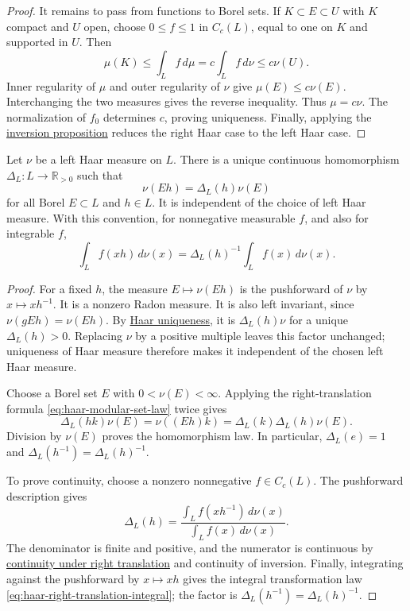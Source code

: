 \begin{proof}
It remains to pass from functions to Borel sets. If $K\subset E\subset U$ with $K$ compact and $U$ open, choose $0\leq f\leq1$ in $C_c(L)$, equal to one on $K$ and supported in $U$. Then
\[
 \mu(K)\leq\int_L f\,d\mu
 =c\int_L f\,d\nu\leq c\nu(U).
\]
Inner regularity of $\mu$ and outer regularity of $\nu$ give $\mu(E)\leq c\nu(E)$. Interchanging the two measures gives the reverse inequality. Thus $\mu=c\nu$. The normalization of $f_0$ determines $c$, proving uniqueness. Finally, applying the \hyperref[measure.haar-inversion]{inversion proposition} reduces the right Haar case to the left Haar case.
\end{proof}

\begin{proposition}\label{measure.haar-modular-function}
Let $\nu$ be a left Haar measure on $L$. There is a unique continuous homomorphism $\Delta_L:L\to\mathbb R_{>0}$ such that
\begin{equation}\label{eq:haar-modular-set-law}
 \nu(Eh)=\Delta_L(h)\nu(E)
\end{equation}
for all Borel $E\subset L$ and $h\in L$. It is independent of the choice of left Haar measure. With this convention, for nonnegative measurable $f$, and also for integrable $f$,
\begin{equation}\label{eq:haar-right-translation-integral}
 \int_L f(xh)\,d\nu(x)
 =\Delta_L(h)^{-1}\int_L f(x)\,d\nu(x).
\end{equation}
\end{proposition}

\begin{proof}
For a fixed $h$, the measure $E\mapsto\nu(Eh)$ is the pushforward of $\nu$ by $x\mapsto xh^{-1}$. It is a nonzero Radon measure. It is also left invariant, since $\nu(gEh)=\nu(Eh)$. By \hyperref[measure.haar-uniqueness]{Haar uniqueness}, it is $\Delta_L(h)\nu$ for a unique $\Delta_L(h)>0$. Replacing $\nu$ by a positive multiple leaves this factor unchanged; uniqueness of Haar measure therefore makes it independent of the chosen left Haar measure.

Choose a Borel set $E$ with $0<\nu(E)<\infty$. Applying the right-translation formula \eqref{eq:haar-modular-set-law} twice gives
\[
 \Delta_L(hk)\nu(E)=\nu((Eh)k)
 =\Delta_L(k)\Delta_L(h)\nu(E).
\]
Division by $\nu(E)$ proves the homomorphism law. In particular, $\Delta_L(e)=1$ and $\Delta_L(h^{-1})=\Delta_L(h)^{-1}$.

To prove continuity, choose a nonzero nonnegative $f\in C_c(L)$. The pushforward description gives
\[
 \Delta_L(h)=
 \frac{\int_L f(xh^{-1})\,d\nu(x)}{\int_L f(x)\,d\nu(x)}.
\]
The denominator is finite and positive, and the numerator is continuous by \hyperref[measure.haar-translation-continuity]{continuity under right translation} and continuity of inversion. Finally, integrating against the pushforward by $x\mapsto xh$ gives the integral transformation law \eqref{eq:haar-right-translation-integral}; the factor is $\Delta_L(h^{-1})=\Delta_L(h)^{-1}$.
\end{proof}

